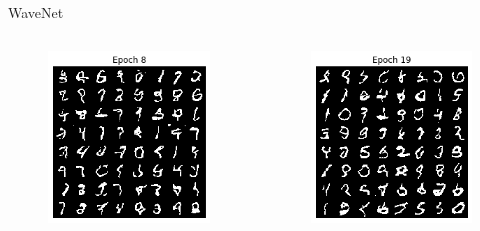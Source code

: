 \begin{frame}[allowframebreaks]{WaveNet}
\begin{columns}
\begin{column}{0.18\linewidth}
\begin{figure}
                \includegraphics[width=1\linewidth]{images/autoregressive/mnist/coord-epoch-8.png}
            \end{figure}
        \end{column}
        \begin{column}{0.18\linewidth}
            \begin{figure}
                \centering
                \includegraphics[width=1\linewidth]{images/autoregressive/mnist/coord-epoch-19.png}

\end{figure}
\end{column}
\end{columns}
\end{frame}
